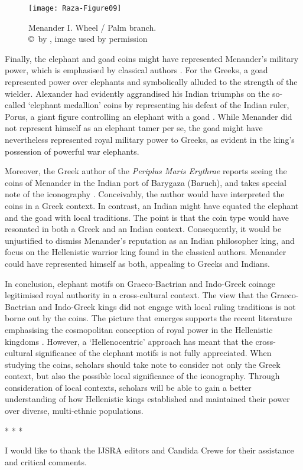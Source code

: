 \documentclass{ijsra}
\begin{document}
\begin{figure}[!htb] %
	\centering
	\texttt{[image: Raza-Figure09]}
	\caption{Menander I. Wheel / Palm branch.
		{\normalfont\scriptsize \\ \copyright\ by \cite{Coin}, image used by permission}}
	\label{fig:Raza-Figure09}
\end{figure}

Finally, the elephant and goad coins might have represented Menander’s military power, which is emphasised by classical authors \parencite[644]{Mairs2015}.
For the Greeks, a goad represented power over elephants and symbolically alluded to the strength of the wielder.
Alexander had evidently aggrandised his Indian triumphs on the so-called ‘elephant medallion’ coins by representing his defeat of the Indian ruler, Porus, a giant figure controlling an elephant with a goad \parencites[151--152]{Holt2003}[204--205]{Stewart1991}.
While Menander did not represent himself as an elephant tamer per se, the goad might have nevertheless represented royal military power to Greeks, as evident in the king’s possession of powerful war elephants. 

Moreover, the Greek author of the \emph{Periplus Maris Erythrae} reports seeing the coins of Menander in the Indian port of Barygaza (Baruch), and takes special note of the iconography \parencite[]{PME. 47}.
Conceivably, the author would have interpreted the coins in a Greek context. In contrast, an Indian might have equated the elephant and the goad with local traditions.
The point is that the coin type would have resonated in both a Greek and an Indian context.
Consequently, it would be unjustified to dismiss Menander’s reputation as an Indian philosopher king, and focus on the Hellenistic warrior king found in the classical authors.
Menander could have represented himself as both, appealing to Greeks and Indians.

In conclusion, elephant motifs on Graeco-Bactrian and Indo-Greek coinage legitimised royal authority in a cross-cultural context.
The view that the Graeco-Bactrian and Indo-Greek kings did not engage with local ruling traditions is not borne out by the coins.
The picture that emerges supports the recent literature emphasising the cosmopolitan conception of royal power in the Hellenistic kingdoms \parencite[11]{Strootman2014}.
However, a ‘Hellenocentric’ approach has meant that the cross-cultural significance of the elephant motifs is not fully appreciated.
When studying the coins, scholars should take note to consider not only the Greek context, but also the possible local significance of the iconography.
Through consideration of local contexts, scholars will be able to gain a better understanding of how Hellenistic kings established and maintained their power over diverse, multi-ethnic populations.

* * *%

I  would like to thank the IJSRA editors and Candida Crewe for their assistance and critical comments.
\IJSRAclosing%
\end{document}
